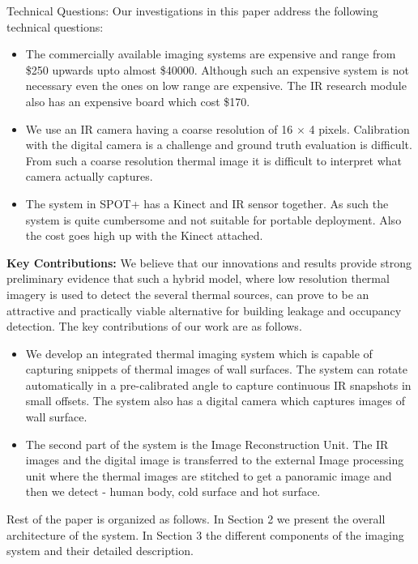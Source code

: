 \documentclass{sig-alternate}
\begin{document}
\indent Technical Questions: Our investigations in this paper address the following technical questions:
 \begin{itemize}
 \item The commercially available imaging systems are expensive and range from \$250 upwards upto almost \$40000. Although such an expensive system is not necessary even the ones on low range are expensive. The IR research module also has an expensive board which cost \$170.
 
 \item We use an IR camera having a coarse resolution of 16 $\times$ 4 pixels. Calibration with the digital camera is a challenge and ground truth evaluation is difficult. From such a coarse resolution thermal image it is difficult to interpret what camera actually captures.
 
 \item The system in SPOT+ has a Kinect and IR sensor together. As such the system is quite cumbersome and not suitable for portable deployment. Also the cost goes high up with the Kinect attached. 
 \end{itemize}

 \indent \textbf{Key Contributions:} We believe that our innovations and results provide strong preliminary evidence that such a hybrid model, where low resolution thermal imagery is used to detect the several thermal sources, can prove to be an attractive and practically viable alternative for building leakage and occupancy detection. The key contributions of our work are as follows.
 
 \begin{itemize}
 \item We develop an integrated thermal imaging system which is capable of capturing snippets of thermal images of wall surfaces. The system can rotate automatically in a pre-calibrated angle to capture continuous IR snapshots in small offsets. The system also has a digital camera which captures images of wall surface.
 
 \item The second part of the system is the Image Reconstruction Unit. The IR images and the digital image is transferred to the external Image processing unit where the thermal images are stitched to get a panoramic image and then we detect - human body, cold surface and hot surface.
 \end{itemize}
 
 Rest of the paper is organized as follows. In Section 2 we present the overall architecture of the system. In Section 3 the different components of the imaging system and their detailed description.
\end{document}
